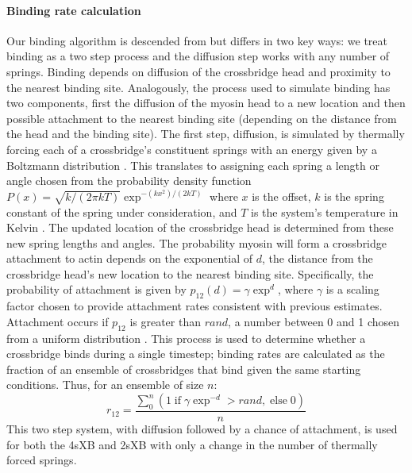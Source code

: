 \documentclass[]{article}
\begin{document}
\paragraph{Binding rate calculation} %
Our binding algorithm is descended from \citet{Tanner2007} but differs in two key ways: we treat binding as a two step process and the diffusion step works with any number of springs.
Binding depends on diffusion of the crossbridge head and proximity to the nearest binding site.
Analogously, the process used to simulate binding has two components, first the diffusion of the myosin head to a new location and then possible attachment to the nearest binding site (depending on the distance from the head and the binding site).
The first step, diffusion, is simulated by thermally forcing each of a crossbridge's constituent springs with an energy given by a Boltzmann distribution \citep{BergBook, HowardBook}.
This translates to assigning each spring a length or angle chosen from the probability density function $P(x) = \sqrt{k / (2 \pi kT)} \exp^{-(k x^2)/(2 kT)}$ where $x$ is the offset, $k$ is the spring constant of the spring under consideration, and $T$ is the system's temperature in Kelvin \citep{DillBook, HowardBook}.
The updated location of the crossbridge head is determined from these new spring lengths and angles.
The probability myosin will form a crossbridge attachment to actin depends on the exponential of $d$, the distance from the crossbridge head's new location to the nearest binding site.
Specifically, the probability of attachment is given by $p_{12}(d) = \gamma \exp ^{d}$, where $\gamma$ is a scaling factor chosen to provide attachment rates consistent with previous estimates.
Attachment occurs if $p_{12}$ is greater than $rand$, a number between 0 and 1 chosen from a uniform distribution \citep{Tanner2007}.
This process is used to determine whether a crossbridge binds during a single timestep; binding rates are calculated as the fraction of an ensemble of crossbridges that bind given the same starting conditions. 
Thus, for an ensemble of size $n$: 
$$r_{12} =  \frac{\sum_0^n \left( 1\; \textrm{if}\; \gamma \exp^{-d}>rand ,\; \textrm{else}\; 0 \right)}{n}$$
This two step system, with diffusion followed by a chance of attachment, is used for both the 4sXB and 2sXB with only a change in the number of thermally forced springs.
\end{document}
